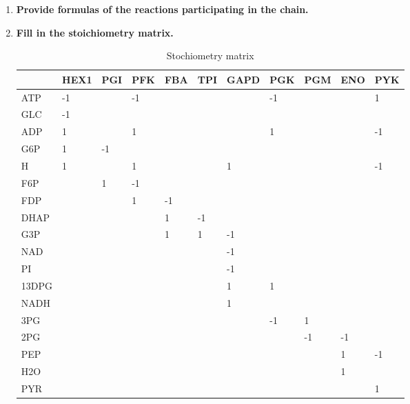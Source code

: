 \documentclass[10pt,a4paper]{article}
\begin{document}
\begin{enumerate}
	
	\item \textbf{Provide formulas of the reactions participating in the chain.}
	
	
	
	
	
	\item \textbf{Fill in the stoichiometry matrix.}
	
	\begin{table}[H]
		\centering
		\caption{Stochiometry matrix}
		\label{my-label}
		\begin{tabular}{|l|l|l|l|l|l|l|l|l|l|l|}
			\hline
			& HEX1 & PGI & PFK & FBA & TPI & GAPD & PGK & PGM & ENO & PYK \\ \hline
			ATP   & -1   &     & -1  &     &     &      & -1  &     &     & 1   \\ \hline
			GLC   & -1   &     &     &     &     &      &     &     &     &     \\ \hline
			ADP   & 1    &     & 1   &     &     &      & 1   &     &     & -1  \\ \hline
			G6P   & 1    & -1  &     &     &     &      &     &     &     &     \\ \hline
			H     & 1    &     & 1   &     &     & 1    &     &     &     & -1  \\ \hline
			F6P   &      & 1   & -1  &     &     &      &     &     &     &     \\ \hline
			FDP   &      &     & 1   & -1  &     &      &     &     &     &     \\ \hline
			DHAP  &      &     &     & 1   & -1  &      &     &     &     &     \\ \hline
			G3P   &      &     &     & 1   & 1   & -1   &     &     &     &     \\ \hline
			NAD   &      &     &     &     &     & -1   &     &     &     &     \\ \hline
			PI    &      &     &     &     &     & -1   &     &     &     &     \\ \hline
			13DPG &      &     &     &     &     & 1    & 1   &     &     &     \\ \hline
			NADH  &      &     &     &     &     & 1    &     &     &     &     \\ \hline
			3PG   &      &     &     &     &     &      & -1  & 1   &     &     \\ \hline
			2PG   &      &     &     &     &     &      &     & -1  & -1  &     \\ \hline
			PEP   &      &     &     &     &     &      &     &     & 1   & -1  \\ \hline
			H2O   &      &     &     &     &     &      &     &     & 1   &     \\ \hline
			PYR   &      &     &     &     &     &      &     &     &     & 1   \\ \hline
		\end{tabular}
	\end{table}
	

\end{enumerate}
\end{document}
